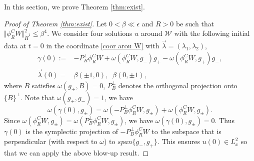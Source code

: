 \documentclass[reqno, 11pt]{amsart}
\numberwithin{equation}{section}
\theoremstyle{plain}
\theoremstyle{definition}
\numberwithin{equation}{section}
\numberwithin{theorem}{section}
\numberwithin{equation}{section}
\numberwithin{equation}{section}
\numberwithin{theorem}{section}
\begin{document}
	In this section, we prove Theorem \ref{thm:exist}.
	\begin{proof}[Proof of Theorem \ref{thm:exist}]
		Let $0<\beta\ll \epsilon$ and $R>0$ be such that $\Vert \phi_{R}^{C}W \Vert_{\dot H^1}^2 \leq \beta^4$. We consider four solutions $u$ around $\mathcal{W}$ with the following initial data at $t=0$ in the coordinate \eqref{coor arou W} with $\vec{\lambda}=(\lambda_{1},\lambda_{2})$,
		\begin{equation*}
		\begin{aligned}
		\gamma(0):=&-P_{B}^{\perp}\phi_{R}^{C}W+\omega\left(\phi_{R}^{C}W,g_-
		\right)g_{+} -  \omega\left(\phi_{R}^{C}W,g_+\right)g_{-},\\
		\vec{\lambda}(0)=&\beta(\pm1,0),\;\; \beta(0,\pm1),
		\end{aligned}
		\end{equation*}
		where $B$ satisfies $\omega(g_{\pm}, B)=0$, $P_{B}^{\perp}$ denotes the orthogonal projection onto $\{B\}^{\perp}$. Note that $\omega(g_+, g_-)=1$, we have
		\begin{equation*}
		\omega(\gamma(0), g_{\pm})=\omega(-P_{B}^{\perp}\phi_{R}^{C}W, g_{\pm})+\omega(\phi_{R}^{C}W, g_{\pm}).
		\end{equation*}
		Since $\omega(\phi_{R}^{C}W, g_{\pm})=\omega(P_{B}^{\perp}\phi_{R}^{C}W, g_{\pm})$, we have $\omega(\gamma(0), g_{\pm})=0$. Thus $\gamma(0)$ is the symplectic projection of $-P_{B}^{\perp}\phi_{R}^{C}W$ to the subspace that is perpendicular (with respect to $\omega$) to $span\{g_-,g_+\}$. This ensures $u(0)\in L_{x}^{2}$ so that we can apply the above blow-up result.
		

\end{proof}
\end{document}

